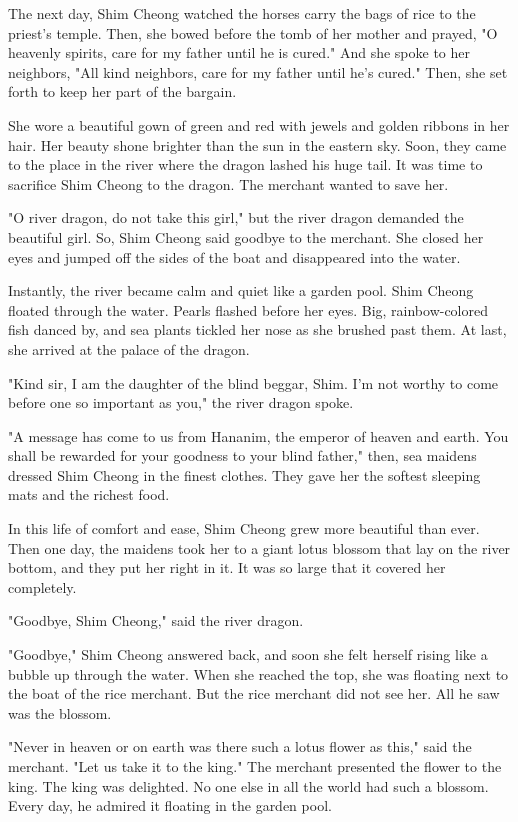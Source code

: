 The next day, Shim Cheong watched the horses carry the bags of rice to the priest's temple. Then, she bowed before the tomb of her mother and prayed, "O heavenly spirits, care for my father until he is cured." And she spoke to her neighbors, "All kind neighbors, care for my father until he's cured." Then, she set forth to keep her part of the bargain.

She wore a beautiful gown of green and red with jewels and golden ribbons in her hair. Her beauty shone brighter than the sun in the eastern sky. Soon, they came to the place in the river where the dragon lashed his huge tail. It was time to sacrifice Shim Cheong to the dragon. The merchant wanted to save her.

"O river dragon, do not take this girl," but the river dragon demanded the beautiful girl. So, Shim Cheong said goodbye to the merchant. She closed her eyes and jumped off the sides of the boat and disappeared into the water.

Instantly, the river became calm and quiet like a garden pool. Shim Cheong floated through the water. Pearls flashed before her eyes. Big, rainbow-colored fish danced by, and sea plants tickled her nose as she brushed past them. At last, she arrived at the palace of the dragon.

"Kind sir, I am the daughter of the blind beggar, Shim. I'm not worthy to come before one so important as you," the river dragon spoke.

"A message has come to us from Hananim, the emperor of heaven and earth. You shall be rewarded for your goodness to your blind father," then, sea maidens dressed Shim Cheong in the finest clothes. They gave her the softest sleeping mats and the richest food.

In this life of comfort and ease, Shim Cheong grew more beautiful than ever. Then one day, the maidens took her to a giant lotus blossom that lay on the river bottom, and they put her right in it. It was so large that it covered her completely.

"Goodbye, Shim Cheong," said the river dragon.

"Goodbye," Shim Cheong answered back, and soon she felt herself rising like a bubble up through the water. When she reached the top, she was floating next to the boat of the rice merchant. But the rice merchant did not see her. All he saw was the blossom.

"Never in heaven or on earth was there such a lotus flower as this," said the merchant. "Let us take it to the king." The merchant presented the flower to the king. The king was delighted. No one else in all the world had such a blossom. Every day, he admired it floating in the garden pool.

